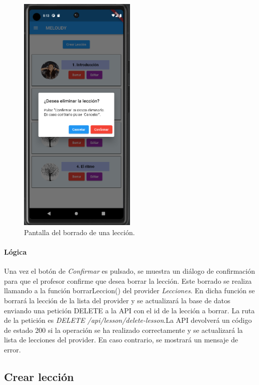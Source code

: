 \begin{figure}[H]
  \centering
  \includegraphics[width=0.5\textwidth]{imagenes/c7/borrarleccion.png}
  \caption{Pantalla del borrado de una lección.} 
  \label{fig:borradoleccion}
\end{figure}

\paragraph*{Lógica}
Una vez el botón de \textit{Confirmar} es pulsado, se muestra un diálogo de confirmación para que el profesor confirme que desea borrar la lección.
Este borrado se realiza llamando a la función borrarLeccion() del provider \textit{Lecciones}. En dicha función se borrará la lección de la lista del provider y se actualizará la base de datos enviando
una petición DELETE a la API con el id de la lección a borrar. La ruta de la petición es \textit{DELETE /api/lesson/delete-lesson}.La API devolverá un código de estado 200 si la operación se ha realizado correctamente y se actualizará la lista de lecciones del provider. En caso contrario, se mostrará un mensaje de error.


\subsection{Crear lección} 

